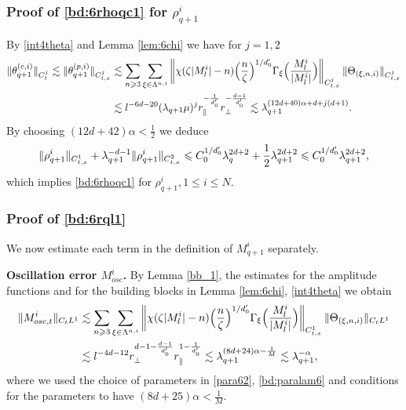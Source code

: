 \documentclass[10pt,a4paper]{amsart}
\numberwithin{equation}{section}
\def\({{\Big(}}
\def\){{\Big)}}
\newcommand{\norm}[1]{\left\|#1\right\|}
\def\geq{\geqslant}
\def\leq{\leqslant}
\def\({{\Big(}}
\def\){{\Big)}}
\def\geq{\geqslant}
\def\leq{\leqslant}
\begin{document}
\subsubsection{Proof of  \eqref{bd:6rhoqc1} for $\rho^{i}_{q+1}$}
  By \eqref{int4theta} and Lemma \ref{lem:6chi} we have for $j=1,2$
\begin{align*}
\|\theta_{q+1}^{(c,i)}\|_{C_{t}^j}\lesssim\|\theta_{q+1}^{(p,i)} \|_{C_{t,x}^j} 
&\lesssim\sum_{n\geq3}\sum_{\xi\in\Lambda^{n,i}}\norm{\chi(\zeta|M^{i}_l|-n)\(\frac{n}{\zeta}\)^{1/d_0'}\Gamma_{\xi}\(\frac{M^{i}_l}{|M^{i}_l|}\)}_{C_{t,x}^j}\|\Theta_{(\xi,n,i)} \|_{C_{t,x}^j} \notag\\ 
&\lesssim l^{-6d-20}(\lambda_{q+1}\mu)^j r_\parallel^{-\frac{1}{d_0'}}r_\perp^{-\frac{d-1}{d_0'}} \lesssim \lambda_{q+1}^{(12d+40)\alpha+d+j(d+1)}.\notag
\end{align*}
By choosing $(12d+42)\alpha<\frac{1}{2}$ we deduce 
\begin{align}
    \|\rho^{i}_{q+1} \|_{C_{t,x}^1}+\lambda_{q+1}^{-d-1}\|\rho^{i}_{q+1}\|_{C_{t,x}^2}%
    \leq C_0^{1/d_0'}\lambda_{q}^{2d+2}+ \frac12\lambda_{q+1}^{2d+2}\leq C_0^{1/d_0'}\lambda_{q+1}^{2d+2},\notag
\end{align}
which implies  \eqref{bd:6rhoqc1} for $\rho^{i}_{q+1},1\leq i\leq N$.  

\subsubsection{Proof of  \eqref{bd:6rql1} }  We now estimate each term in the definition of $M_{q+1}^i$ separately.

 
\textbf{Oscillation error $M^{i}_{osc}$.} By Lemma \ref{bb_1}, the estimates for the amplitude functions and for the building blocks in  Lemma \ref{lem:6chi}, \eqref{int4theta}    we obtain
\begin{align}
    \|M^{i}_{osc,t}\|_{C_tL^1}
    &\lesssim \sum_{n\geq3}\sum_{\xi\in\Lambda^{n,i}}\norm{\chi(\zeta|M^{i}_l|-n)\(\frac{n}{\zeta}\)^{1/d_0'}\Gamma_{\xi}\(\frac{M^{i}_l}{|M^{i}_l|}\)}_{C_{t,x}^1} \|\Theta_{(\xi,n,i)}\|_{C_tL^1}\notag\\
    &\lesssim l^{-4d-12}r_\perp^{d-1-\frac{d-1}{d_0'}}r_\parallel^{1-\frac{1}{d_0'}} \lesssim \lambda_{q+1}^{(8d+24)\alpha-\frac 1{M}}\lesssim  \lambda_{q+1}^{-\alpha},\notag
\end{align}
where we used the choice of parameters in 
\eqref{para62},  \eqref{bd:paralam6} and  conditions for the parameters to have $(8d+25)\alpha<\frac 1{M}$.
\end{document}
